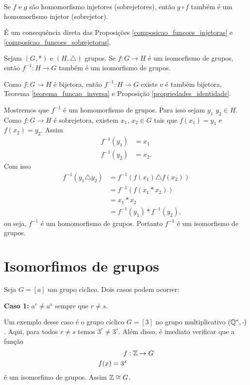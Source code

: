 \begin{corolario}
    Se $f$ e $g$ s\~ao homomorfismo injetores (sobrejetores), ent\~ao $g \circ f$ tamb\'em \'e um homomorfismo injetor (sobrejetor).
\end{corolario}
\begin{prova}
	\'E um consequ\^encia direta das Proposi\c{c}\~oes \eqref{composicao_funcoes_injetoras} e \eqref{composicao_funcoes_sobrejetoras}.
\end{prova}


\begin{proposicao}
    Sejam $(G, *)$ e $(H, \triangle)$ grupos. Se $f : G \to H$ \'e um isomorfismo de grupos, ent\~ao $f^{-1} : H \to G$ tamb\'em \'e um isomorfismo de grupos.
\end{proposicao}
\begin{prova}
	Como $f : G \to H$ \'e bijetora, ent\~ao $f^{-1} : H \to G$ existe e \'e tamb\'em bijetora, Teorema \eqref{teorema_funcao_inversa} e Proposi\c{c}\~ao \eqref{propriedades_identidade}.

	Mostremos que $f^{-1}$ \'e um homomorfismo de grupos. Para isso sejam $y_1$ $y_2 \in H$. Como $f : G \to H$ \'e sobrejetora, existem $x_1$, $x_2 \in G$ tais que $f(x_1) = y_1$ e $f(x_2) = y_ 2$. Assim
	\begin{align*}
		f^{-1}(y_1) &= x_1\\
		f^{-1}(y_2) &= x_2.
	\end{align*}
	Com isso
	\begin{align*}
		f^{-1}(y_1 \triangle y_2) &= f^{-1}(f(x_1) \triangle f(x_2)) \\ &= f^{-1}(f(x_1 * x_2)) \\ &= x_1 * x_2 \\ &= f^{-1}(y_1) * f^{-1}(y_2),
	\end{align*}
	ou seja, $f^{-1}$ \'e um homomorfismo de grupos.
	Portanto $f^{-1}$ \'e um isomorfismo de grupos.
\end{prova}

\section{Isomorfimos de grupos} %
\label{sec:isomorfimos_de_grupos}

Seja $G = [a]$ um grupo c{\'\i}clico. Dois casos podem ocorrer:

\textbf{Caso 1:} $a^r \ne a^s$ sempre que $r \ne s$.

Um exemplo desse caso é o grupo cíclico $G = [3]$ no grupo multiplicativo $(\mathbb{Q}^*, \cdot)$. Aqui, para todos $r \ne s$ temos $3^r \ne 3^s$. Além disso, é imediato verificar que a função
\begin{align*}
	f &: \mathbb{Z} \to G\\
	f(x) = 3^x
\end{align*}
é um isomorfimo de grupos. Assim $\mathbb{Z} \cong G$.

